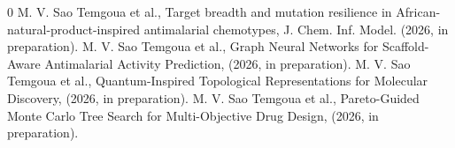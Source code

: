 \documentclass[12pt,a4paper]{article}
\begin{document}
	
	\begingroup
	\renewcommand{\section}[2]{}
	\begin{thebibliography}{0}
		\setlength{\parskip}{0mm}
		\setlength{\itemsep}{-0.3mm}
		\small
		 M. V. Sao Temgoua et al., Target breadth and mutation resilience in African-natural-product-inspired antimalarial chemotypes, J. Chem. Inf. Model. (2026, in preparation).
		 M. V. Sao Temgoua et al., Graph Neural Networks for Scaffold-Aware Antimalarial Activity Prediction, (2026, in preparation).
		 M. V. Sao Temgoua et al., Quantum-Inspired Topological Representations for Molecular Discovery, (2026, in preparation).
		 M. V. Sao Temgoua et al., Pareto-Guided Monte Carlo Tree Search for Multi-Objective Drug Design, (2026, in preparation).
	\end{thebibliography}
	\endgroup
	
	
\end{document}

